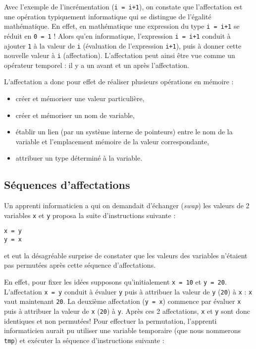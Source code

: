 Avec l'exemple de l'incrémentation ({\tt i = i+1}), 
on constate que l'affectation est une opération 
typiquement informatique qui se distingue de l'égalité mathématique. En effet,
en mathématique une expression du type {\tt i = i+1} se réduit en
{\tt 0 = 1} ! Alors qu'en informatique, l'expression {\tt i = i+1} conduit à ajouter {\tt 1} 
à la valeur de {\tt i} (évaluation de l'expression {\tt i+1}), puis à donner cette
nouvelle valeur à {\tt i} (affectation).
L'affectation peut ainsi être vue comme un opérateur temporel : il y a un avant et
un après l'affectation.

L'affectation a donc pour effet de réaliser plusieurs opérations en mémoire :
\begin{itemize}
\item créer et mémoriser une valeur particulière,
\item créer et mémoriser un nom de variable,
\item établir un lien (par un système interne de pointeurs) entre le nom de la variable 
	et l'emplacement mémoire de la valeur correspondante,
\item attribuer un type déterminé à la variable.
\end{itemize}

\subsection{Séquences d'affectations}\label{affectation:cours:sequences}
Un apprenti informaticien a qui on demandait d'échanger ({\em swap}) les valeurs
de 2 variables {\tt x} et {\tt y} proposa la suite d'instructions suivante :
\vspace*{2mm}

\noindent\begin{minipage}{2cm}
\begin{Verbatim}
x = y
y = x
\end{Verbatim}
\end{minipage}
\hfill
\begin{minipage}{13cm}
et eut la désagréable surprise de constater que les valeurs des variables 
n'étaient pas permutées après cette séquence d'affectations.
\end{minipage}
\vspace*{2mm}

\noindent En effet, pour fixer les idées supposons qu'initialement {\tt x = 10} et {\tt y = 20}.
L'affectation {\tt x = y} conduit à évaluer {\tt y} puis à attribuer la valeur de {\tt y} ({\tt 20})
à {\tt x} : {\tt x} vaut maintenant {\tt 20}. La deuxième affectation ({\tt y = x}) 
commence par évaluer {\tt x} puis à attribuer la valeur de {\tt x} ({\tt 20}) à {\tt y}.
Après ces 2 affectations, {\tt x} et {\tt y} sont donc identiques et non permutées! 
Pour effectuer la permutation, l'apprenti informaticien aurait pu utiliser une variable 
temporaire (que nous nommerons {\tt tmp}) et exécuter la séquence d'instructions suivante :
\vspace*{2mm}


